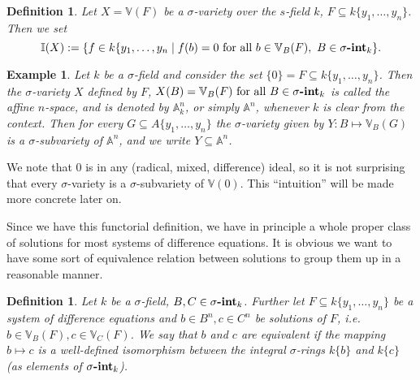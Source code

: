 \documentclass{article}
\def\I{\mathbb{I}}
\def\VV{\mathbb{V}}
\def\s{\sigma}
\def\fa{\text{ for all }}
\newcommand{\catname}[1]{{\normalfont\textbf{#1}}}
\newcommand{\sintk}{\s\text{\catname{-int}}_k}
\theoremstyle{plain}
\newtheorem{ex}[Satz]{Example}
\newtheorem{lem}[Satz]{Lemma}
\newtheorem{defn}[Satz]{Definition}
\theoremstyle{definition}
\begin{document}
\begin{defn}\label{defnI}
Let $X = \VV(F)$ be a $\s$-variety over the $s$-field $k$, $F \subseteq k\{y_1,\ldots,y_n\}$. Then we set $$\I(X):= \{ f \in k\{y_1,\ldots,y_n \mid f(b) = 0 \fa b \in \VV_B(F), ~ B \in \sintk \}.$$ \index{ $\I(X)$}
\end{defn}

\begin{ex}\label{A^n}
Let $k$ be a $\s$-field and consider the set $\{ 0 \} = F \subseteq k\{y_1,\ldots,y_n\}$. Then the $\s$-variety $X$ defined by $F$, $X(B) = \VV_B(F) \fa B \in \sintk$ is called the affine $n$-space, and is denoted by $\mathbb{A}^n_k$, 
or simply $\mathbb{A}^n$, whenever $k$ is clear from the context. Then for every $G \subseteq A\{y_1,\ldots,y_n\}$ the $\s$-variety given by $Y: B \mapsto \VV_B(G)$ is a $\s$-subvariety of $\mathbb{A}^n$, 
and we write $Y \subseteq \mathbb{A}^n$.
\end{ex}

We note that $0$ is in any (radical, mixed, difference) ideal, so it is not surprising that every $\s$-variety is a $\s$-subvariety of $\VV(0)$. This ``intuition'' will be made more concrete later on.

Since we have this functorial definition, we have in principle a whole proper class of solutions for most systems of difference equations. 
It is obvious we want to have some sort of equivalence relation between solutions to group them up in a reasonable manner.

\begin{defn}\label{equivsols}
Let $k$ be a $\s$-field, $B,C \in \sintk$. Further let $F \subseteq k\{y_1,\ldots,y_n\}$ be a system of difference equations and $b \in B^n, c \in C^n$ be solutions of $F$, i.e. $b \in \VV_B(F), c \in \VV_C(F)$.
We say that $b$ and $c$ are equivalent if the mapping $b \mapsto c$ is a well-defined isomorphism between the integral $\s$-rings $k\{b\}$ and $k\{c\}$  (as elements of $\sintk$). 
\end{defn}

\end{document}
